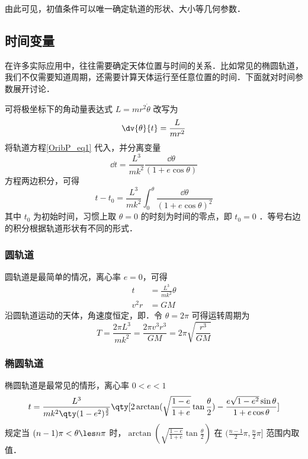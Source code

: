 由此可见，初值条件可以唯一确定轨道的形状、大小等几何参数．

\subsection{时间变量}
在许多实际应用中，往往需要确定天体位置与时间的关系．比如常见的椭圆轨道，我们不仅需要知道周期，还需要计算天体运行至任意位置的时间．下面就对时间参数展开讨论．

可将极坐标下的角动量表达式 $ L  = mr^2\dot{\theta}$ 改写为
\begin{equation} 
\dv{\theta}{t}=\frac{L}{mr^2}
\end{equation}
将轨道方程\autoref{OribP_eq1} 代入，并分离变量
\begin{equation}
\dd{t}=\frac{L^3}{mk^2}\frac{\dd{\theta}}{(1+e\cos\theta)}
\end{equation}
方程两边积分，可得
\begin{equation}\label{OribP_eq11}
t-t_0 = \frac{L^3}{mk^2}\int_0^{\theta} \frac{\dd{\theta}}{(1+e\cos\theta)^2}
\end{equation}
其中 $t_0$ 为初始时间，习惯上取 $\theta=0$ 的时刻为时间的零点，即 $t_0=0$ ．等号右边的积分根据轨道形状有不同的形式．

\subsubsection{圆轨道}
圆轨道是最简单的情况，离心率 $e=0$，可得
\begin{align}
t &=\frac{L^3}{mk^2}\theta \\
v^2r &=GM 
\end{align}
沿圆轨道运动的天体，角速度恒定，即．令 $\theta=2\pi$ 可得运转周期为
\begin{equation}
T=\frac{2\pi L^3}{mk^2}=\frac{2\pi v^3r^3}{GM}=2\pi \sqrt{\frac{r^3}{GM}}
\end{equation}

\subsubsection{椭圆轨道}
椭圆轨道是最常见的情形，离心率 $0<e<1$
\begin{equation}\label{OribP_eq14}
t = \frac{L^3}{mk^2\qty(1-e^2)^{\frac{3}{2}}}\qty[2\arctan(\sqrt{\frac{1-e}{1+e}}\tan\frac{\theta}{2})-\frac{e\sqrt{1-e^2}\sin\theta}{1+e\cos\theta}]
\end{equation}
规定当 $(n-1)\pi<\theta \les n\pi$ 时，$\arctan(\sqrt{\frac{1-e}{1+e}}\tan\frac{\theta}{2})$ 在 $(\frac{n-1}{2}\pi,\frac{n}{2}\pi]$ 范围内取值．

